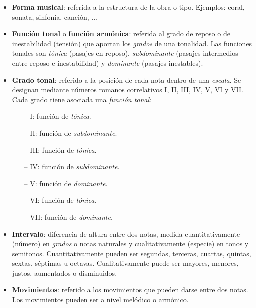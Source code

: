 \begin{itemize}[label={}, leftmargin=*]
	\bigskip

	\label{forma}
	\item \textbf{Forma musical}: referida a la estructura de la obra o tipo. Ejemplos: coral, sonata, sinfonía, canción, ...

	\bigskip

	\label{funcion}
	\item \textbf{Función tonal} o \textbf{función armónica}: referida al grado de reposo o de inestabilidad (tensión) que aportan los \textit{grados} de una tonalidad. Las funciones tonales son \textit{tónica} (pasajes en reposo), \textit{subdominante} (pasajes intermedios entre reposo e inestabilidad)  y \textit{dominante} (pasajes inestables). 

	\bigskip

	\label{grado}
	\item \textbf{Grado tonal}: referido a la posición de cada nota dentro de una \textit{escala}. Se designan mediante números romanos correlativos I, II, III, IV, V, VI y VII. Cada grado tiene asociada una \textit{función tonal}:

	\begin{itemize}

		\item[--] I: función de \textit{tónica}.
		\item[--] II: función de \textit{subdominante}.
		\item[--] III: función de \textit{tónica}.
		\item[--] IV: función de \textit{subdominante}.
		\item[--] V: función de \textit{dominante}.
		\item[--] VI: función de \textit{tónica}.
		\item[--] VII: función de \textit{dominante}.

	\end{itemize}

	\bigskip

	\label{intervalo}
	\item \textbf{Intervalo}: diferencia de altura entre dos notas, medida cuantitativamente (número) en \textit{grados} o notas naturales y cualitativamente (especie) en tonos y semitonos. Cuantitativamente pueden ser segundas, terceras, cuartas, quintas, sextas, séptimas u octavas. Cualitativamente puede ser mayores, menores, justos, aumentados o disminuidos.

	\bigskip

	\label{movimientos}
	\item \textbf{Movimientos}: referido a los movimientos que pueden darse entre dos notas. Los movimientos pueden ser a nivel melódico o armónico.


\end{itemize}
